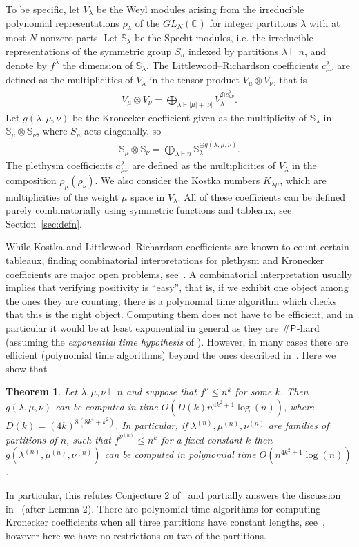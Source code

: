 \documentclass[11pt]{amsart}
\newtheorem{thm}{Theorem}[section]
\theoremstyle{plain}
\theoremstyle{definition}
\numberwithin{equation}{section}
\newcommand{\la}{\lambda}
\def\SP{{{\rm{\textsf{\#P}}}}}
\def\la{\lambda}
\begin{document}
To be specific, let $V_\la$ be the Weyl modules arising from the irreducible polynomial representations $\rho_\la$ of the $GL_N(\mathbb{C})$ for integer partitions $\la$ with at most $N$ nonzero parts. Let $\mathbb{S}_\la$ be the Specht modules, i.e. the irreducible representations of the symmetric group $S_n$ indexed by partitions $\la \vdash n$, and denote by $f^\la$ the dimension of $\mathbb{S}_\la$. The Littlewood--Richardson coefficients $c^\la_{\mu\nu}$ are defined as the multiplicities of $V_\la$ in the tensor product $V_\mu \otimes V_\nu$, that is
\begin{align}
V_\mu \otimes V_\nu = \bigoplus_{\la \vdash |\mu|+|\nu|} V_\la^{\oplus c^\la_{\mu\nu}}.
\end{align}
Let $g(\la,\mu,\nu)$ be the Kronecker coefficient given as the multiplicity of $\mathbb{S}_\la$ in $\mathbb{S}_\mu \otimes \mathbb{S}_\nu$, where $S_n$ acts diagonally, so
\begin{align}
\mathbb{S}_\mu \otimes \mathbb{S}_\nu = \bigoplus_{\la \vdash n} \mathbb{S}_\la^{\oplus g(\la,\mu,\nu)}.
\end{align}
The plethysm coefficients $a^\la_{\mu \nu}$ are defined as the multiplicities of $V_\la$  in the composition $\rho_\mu(\rho_\nu)$. We also consider the Kostka numbers $K_{\la\mu}$, which are multiplicities of the weight $\mu$ space in $V_\la$. All of these coefficients can be defined purely combinatorially using symmetric functions and tableaux, see Section~\ref{sec:defn}.

While Kostka and Littlewood--Richardson coefficients are known to count certain tableaux, finding combinatorial interpretations for plethysm and Kronecker coefficients are major open problems, see~\cite{colmenarejo2022mystery,Pak22,Pan23,Sta00}. A combinatorial interpretation usually implies that verifying positivity is ``easy'', that is, if we exhibit one object among the ones they are counting, there is a polynomial time algorithm which checks that this is the right object. Computing them does not have to be efficient, and in particular it would be at least exponential in general as they are $\SP$-hard (assuming the \emph{exponential time hypothesis} of \cite{impagliazzo2001complexity}). However, in many cases there are efficient (polynomial time algorithms) beyond the ones described in~\cite{CDW,PPcomp}. Here we show that

\begin{thm}\label{thm:kron1}
Let $\la,\mu,\nu \vdash n$ and suppose that $f^\nu \leq n^k$ for some $k$. Then $g(\la,\mu,\nu)$ can be computed in time $O(D(k) n^{4k^2+1}\log(n))$, where $D(k) = (4k)^{8(8k^4+k^2)}$. In particular, if $\la^{(n)}, \mu^{(n)},\nu^{(n)}$ are families of partitions of $n$, such that $f^{\nu^{(n)}} \leq n^k$ for a fixed constant $k$ then $g(\la^{(n)},\mu^{(n)},\nu^{(n)})$ can be computed in polynomial time $O(n^{4k^2+1}\log(n))$. 
\end{thm} 
In particular, this refutes Conjecture 2 of~\cite{LH24} and partially answers the discussion in~\cite{bravyi2024quantum} (after Lemma 2). There are  polynomial time algorithms for computing Kronecker coefficients when all three partitions have constant lengths, see~\cite{CDW,PPcomp}, however here we have no restrictions on two of the partitions. 
\end{document}
